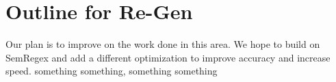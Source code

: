 \documentclass[11pt,a4paper]{article}
\begin{document}
\section{Outline for Re-Gen}

Our plan is to improve on the work done in this area. We hope to build on SemRegex and add a different optimization to improve accuracy and increase speed. something something, something something









\end{document}
